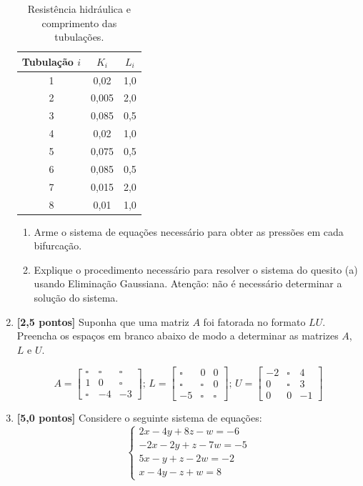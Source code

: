 \documentclass[12pt,a4paper]{article}
\begin{document}
\begin{enumerate}
\begin{table}[H]
 \centering
 \begin{tabular}{c|c|c}
  Tubulação $i$ & $K_i$ & $L_i$ \\ \hline
  1 & 0,02 & 1,0 \\ \hline
  2 & 0,005 & 2,0 \\ \hline
  3 & 0,085 & 0,5 \\ \hline
  4 & 0,02 & 1,0 \\ \hline
  5 & 0,075 & 0,5 \\ \hline
  6 & 0,085 & 0,5 \\ \hline
  7 & 0,015 & 2,0 \\ \hline
  8 & 0,01 & 1,0 
 \end{tabular}
 \caption{Resistência hidráulica e comprimento das tubulações.}
 \label{tab:dados}
\end{table}

\begin{enumerate}
 \item Arme o sistema de equações necessário para obter as pressões em cada bifurcação.
 \item Explique o procedimento necessário para resolver o sistema do quesito (a) usando Eliminação Gaussiana. Atenção: não é necessário determinar a solução do sistema. 
\end{enumerate}

 \item \textbf{[2,5 pontos]} Suponha que uma matriz $A$ foi fatorada no formato $LU$. Preencha os espaços em branco abaixo de modo a determinar 
as matrizes $A$, $L$ e $U$.

$$
A = \begin{bmatrix}\square & \square & \square \\ 1 & 0 & \square \\ \square & -4 & -3\end{bmatrix};\,  
L = \begin{bmatrix}\square & 0 & 0 \\ \square & \square & 0 \\ -5 & \square & \square\end{bmatrix};\, 
U = \begin{bmatrix}-2 & \square & 4 \\ 0 & \square & 3 \\ 0 & 0 & -1\end{bmatrix}
$$

 \item \textbf{[5,0 pontos]} Considere o seguinte sistema de equações:
  $$%
   \begin{cases}
    2x - 4y + 8z  - w = -6 \\
    -2x  - 2y + z - 7w = -5 \\
    5x  - y + z - 2w = -2 \\
    x - 4y - z + w = 8
   \end{cases}
  $$


\end{enumerate}
\end{document}
